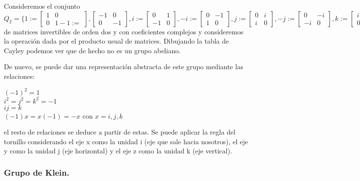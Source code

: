 Consideremos el conjunto 
$Q_2 = \{
1 := \begin{bmatrix}
    1 & 0  \\
    0 & 1 
-1 := \end{bmatrix},
\begin{bmatrix}
    -1 & 0  \\
    0 & -1 
\end{bmatrix},
i := \begin{bmatrix}
    0 & 1  \\
    -1 & 0 
\end{bmatrix},
-i := \begin{bmatrix}
    0 & -1  \\
    1 & 0 
\end{bmatrix},
j := \begin{bmatrix}
    0 & i  \\
    i & 0 
\end{bmatrix},
-j := \begin{bmatrix}
    0 & -i  \\
    -i & 0 
\end{bmatrix},
k := \begin{bmatrix}
    i & 0  \\
    0 & -i 
\end{bmatrix},
-k := \begin{bmatrix}
    -i & 0  \\
    0 & i 
\end{bmatrix} \}$
de matrices invertibles de orden dos y con coeficientes complejos y consideremos la operación dada por el producto usual de matrices. Dibujando la tabla de Cayley podemos ver que de hecho no es un grupo abeliano.

De nuevo, se puede dar una representación abstracta de este grupo mediante las relaciones:

$(-1)^2 = 1$ \\
$i^2 = j^2 = k^2 = -1$ \\
$ij = k$ \\
$(-1)x = x(-1) = -x$ con $x = i,j,k$

el resto de relaciones se deduce a partir de estas. Se puede aplicar la regla del tornillo considerando el eje x como la unidad i (eje que sale hacia nosotros), el eje y como la unidad j (eje horizontal) y el eje z como la unidad k (eje vertical).

\subsubsection{Grupo de Klein.}

